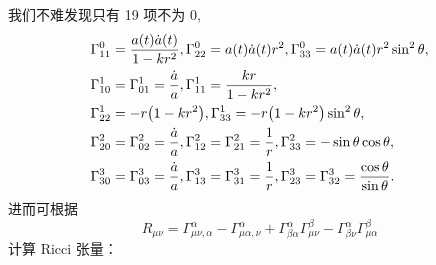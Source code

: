 \documentclass[../天体物理基础.tex]{subfiles}
\begin{document}
我们不难发现只有 19 项不为 0,
\begin{align}
\Gamma_{11}^{0}&=\frac{a\mleft(t\mright)\dot{a}\mleft(t\mright)}{1-kr^{2}},\Gamma_{22}^{0}=a\mleft(t\mright)\dot{a}\mleft(t\mright) r^{2},\Gamma_{33}^{0}=a\mleft(t\mright)\dot{a}\mleft(t\mright) r^{2}\sin^{2}{\theta},\notag\\
\Gamma_{10}^{1}&=\Gamma_{01}^{1}=\frac{\dot a}{a},\Gamma_{11}^{1}=\frac{kr}{1-kr^{2}},\notag\\
\Gamma_{22}^{1}&=-r\mleft(1-kr^{2}\mright),\Gamma_{33}^{1}=-r\mleft(1-kr^{2}\mright)\sin^{2}{\theta},\notag\\
\Gamma_{20}^{2}&=\Gamma_{02}^{2}=\frac{\dot a}{a},\Gamma_{12}^{2}=\Gamma_{21}^{2}=\frac{1}{r},\Gamma_{33}^{2}=-\sin{\theta}\cos{\theta},\notag\\
\Gamma_{30}^{3}&=\Gamma_{03}^{3}=\frac{\dot a}{a},\Gamma_{13}^{3}=\Gamma_{31}^{3}=\frac{1}{r},\Gamma_{23}^{3}=\Gamma_{32}^{3}=\frac{\cos{\theta}}{\sin{\theta}}.\notag
\end{align}
进而可根据
\begin{equation}
R_{\mu\nu}=\Gamma_{\mu\nu,\alpha}^{\alpha}-\Gamma_{\mu\alpha,\nu}^{\alpha}+\Gamma_{\beta\alpha}^{\alpha}\Gamma_{\mu\nu}^{\beta}-\Gamma_{\beta\nu}^{\alpha}\Gamma_{\mu\alpha}^{\beta}
\end{equation}
计算 Ricci 张量：
\end{document}
